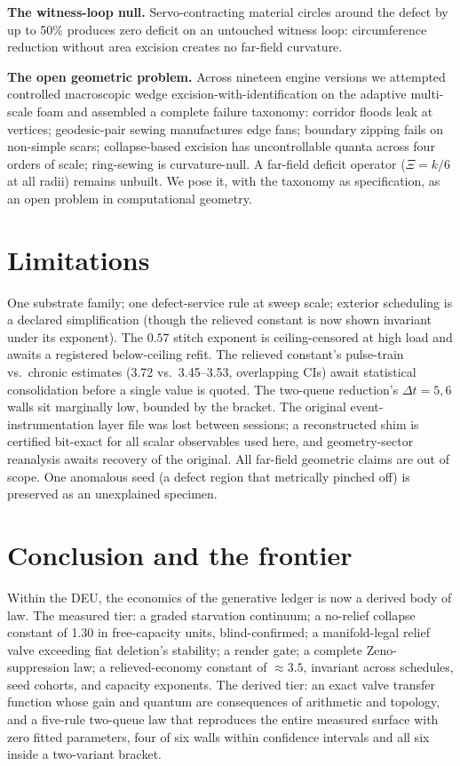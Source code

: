 \documentclass[11pt]{article}
\newcommand{\dt}{\Delta t}
\begin{document}
\textbf{The witness-loop null.} Servo-contracting material circles around the
defect by up to 50\% produces zero deficit on an untouched witness loop:
circumference reduction without area excision creates no far-field curvature.

\textbf{The open geometric problem.} Across nineteen engine versions we
attempted controlled macroscopic wedge excision-with-identification on the
adaptive multi-scale foam and assembled a complete failure taxonomy: corridor
floods leak at vertices; geodesic-pair sewing manufactures edge fans;
boundary zipping fails on non-simple scars; collapse-based excision has
uncontrollable quanta across four orders of scale; ring-sewing is
curvature-null. A far-field deficit operator ($\Xi=k/6$ at all radii) remains
unbuilt. We pose it, with the taxonomy as specification, as an open problem
in computational geometry.

\section{Limitations}
One substrate family; one defect-service rule at sweep scale; exterior
scheduling is a declared simplification (though the relieved constant is now
shown invariant under its exponent). The $0.57$ stitch exponent is
ceiling-censored at high load and awaits a registered below-ceiling refit.
The relieved constant's pulse-train vs.\ chronic estimates (3.72 vs.\
3.45--3.53, overlapping CIs) await statistical consolidation before a single
value is quoted. The two-queue reduction's $\dt=5,6$ walls sit marginally low,
bounded by the bracket. The original event-instrumentation layer file was
lost between sessions; a reconstructed shim is certified bit-exact for all
scalar observables used here, and geometry-sector reanalysis awaits recovery
of the original. All far-field geometric claims are out of scope. One
anomalous seed (a defect region that metrically pinched off) is preserved as
an unexplained specimen.

\section{Conclusion and the frontier}
Within the DEU, the economics of the generative ledger is now a derived body
of law. The measured tier: a graded starvation continuum; a no-relief
collapse constant of 1.30 in free-capacity units, blind-confirmed; a
manifold-legal relief valve exceeding fiat deletion's stability; a render
gate; a complete Zeno-suppression law; a relieved-economy constant of
${\approx}3.5$, invariant across schedules, seed cohorts, and capacity
exponents. The derived tier: an exact valve transfer function whose gain and
quantum are consequences of arithmetic and topology, and a five-rule
two-queue law that reproduces the entire measured surface with zero fitted
parameters, four of six walls within confidence intervals and all six inside
a two-variant bracket.
\end{document}
